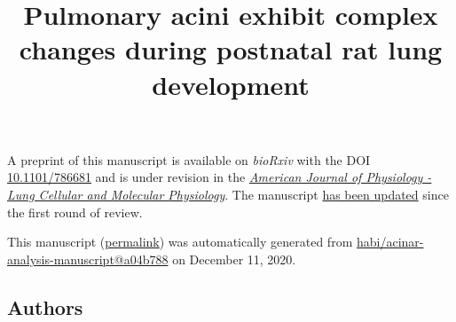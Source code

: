 \documentclass[
  american,
]{article}
\title{Pulmonary acini exhibit complex changes during postnatal rat lung development}
\author{}
\date{}
\begin{document}
\maketitle

A preprint of this manuscript is available on \emph{bioRxiv} with the DOI \href{https://doi.org/10.1101/786681}{10.1101/786681} and is under revision in the \href{https://journals.physiology.org/journal/ajplung}{\emph{American Journal of Physiology - Lung Cellular and Molecular Physiology}}.
The manuscript \href{https://github.com/habi/acinar-analysis-manuscript/compare/d6fc17bd66bdca5cbff30d53e1dbc02d5351609b...a04b78817dad0c1dd6ce05f2e961363c2da567ba}{has been updated} since the first round of review.

This manuscript
(\href{https://habi.github.io/acinar-analysis-manuscript/v/a04b78817dad0c1dd6ce05f2e961363c2da567ba/}{permalink})
was automatically generated
from \href{https://github.com/habi/acinar-analysis-manuscript/tree/a04b78817dad0c1dd6ce05f2e961363c2da567ba}{habi/acinar-analysis-manuscript@a04b788}
on December 11, 2020.

\hypertarget{authors}{%
\subsection{Authors}\label{authors}}
\end{document}
